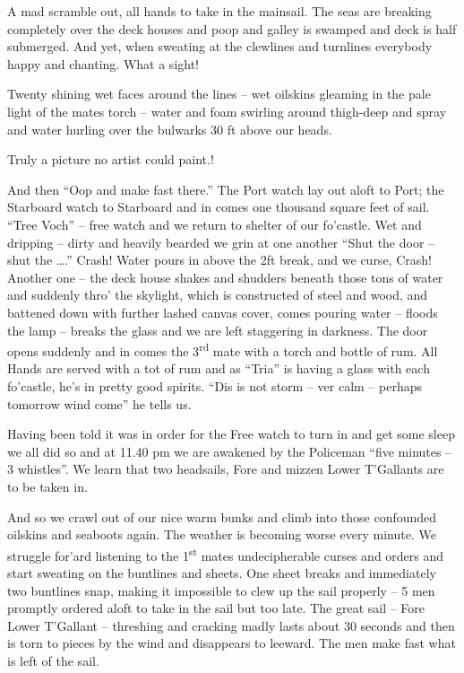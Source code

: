 \documentclass[
  11pt,
  msmallroyalvopaper
]{memoir}
\begin{document}
A mad scramble out, all hands to take in the mainsail. The seas are
breaking completely over the deck houses and poop and galley is swamped
and deck is half submerged. And yet, when sweating at the clewlines and
turnlines everybody happy and chanting. What a sight!

Twenty shining wet faces around the lines -- wet oilskins gleaming in
the pale light of the mates torch -- water and foam swirling around
thigh-deep and spray and water hurling over the bulwarks 30 ft above our
heads.

Truly a picture no artist could paint.!

And then ``Oop and make fast there.'' The Port watch lay out aloft to
Port; the Starboard watch to Starboard and in comes one thousand square
feet of sail. ``Tree Voch'' -- free watch and we return to shelter of
our fo'castle. Wet and dripping -- dirty and heavily bearded we grin at
one another ``Shut the door -- shut the \ldots.'' Crash! Water pours in
above the 2ft break, and we curse, Crash! Another one -- the deck house
shakes and shudders beneath those tons of water and suddenly thro' the
skylight, which is constructed of steel and wood, and battened down with
further lashed canvas cover, comes pouring water -- floods the lamp --
breaks the glass and we are left staggering in darkness. The door opens
suddenly and in comes the 3\textsuperscript{rd} mate with a torch and
bottle of rum. All Hands are served with a tot of rum and as ``Tria'' is
having a glass with each fo'castle, he's in pretty good spirits. ``Dis
is not storm -- ver calm -- perhaps tomorrow wind come'' he tells us.

Having been told it was in order for the Free watch to turn in and get
some sleep we all did so and at 11.40 pm we are awakened by the
Policeman ``five minutes -- 3 whistles''. We learn that two headsails,
Fore and mizzen Lower T'Gallants are to be taken in.

And so we crawl out of our nice warm bunks and climb into those
confounded oilskins and seaboots again. The weather is becoming worse
every minute. We struggle for'ard listening to the 1\textsuperscript{st}
mates undecipherable curses and orders and start sweating on the
buntlines and sheets. One sheet breaks and immediately two buntlines
snap, making it impossible to clew up the sail properly -- 5 men
promptly ordered aloft to take in the sail but too late. The great sail
-- Fore Lower T'Gallant -- threshing and cracking madly lasts about 30
seconds and then is torn to pieces by the wind and disappears to
leeward. The men make fast what is left of the sail.
\end{document}
